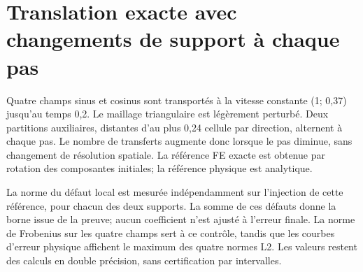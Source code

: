 \documentclass[10pt,a4paper]{article}
\begin{document}
\section{Translation exacte avec changements de support à chaque pas}
Quatre champs sinus et cosinus sont transportés à la vitesse constante (1; 0,37) jusqu'au temps 0,2. Le maillage triangulaire est légèrement perturbé. Deux partitions auxiliaires, distantes d'au plus 0,24 cellule par direction, alternent à chaque pas. Le nombre de transferts augmente donc lorsque le pas diminue, sans changement de résolution spatiale. La référence FE exacte est obtenue par rotation des composantes initiales; la référence physique est analytique.

La norme du défaut local est mesurée indépendamment sur l'injection de cette référence, pour chacun des deux supports. La somme de ces défauts donne la borne issue de la preuve; aucun coefficient n'est ajusté à l'erreur finale. La norme de Frobenius sur les quatre champs sert à ce contrôle, tandis que les courbes d'erreur physique affichent le maximum des quatre normes L2. Les valeurs restent des calculs en double précision, sans certification par intervalles.
\end{document}
